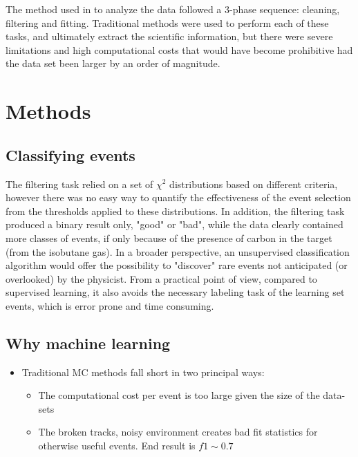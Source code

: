 \documentclass[preprint,12pt]{elsarticle}
\begin{document}
The method used in \cite{Bradt2018} to analyze the data followed a 3-phase sequence: cleaning, filtering and fitting. Traditional methods were used to perform each of these tasks, and ultimately extract the scientific information, but there were severe limitations and high computational costs that would have become prohibitive had the data set been larger by an order of magnitude.

\section{Methods}\label{sec:methods}

\subsection{Classifying  events} 
The filtering task relied on a set of $\chi^2$ distributions based on different criteria, however there was no easy way to quantify the effectiveness of the event selection from the thresholds applied to these distributions. In addition, the filtering task produced a binary result only, "good" or "bad", while the data clearly contained more classes of events, if only because of the presence of carbon in the target (from the isobutane gas). In a broader perspective, an unsupervised classification algorithm would offer the possibility to "discover" rare events not anticipated (or overlooked) by the physicist. From a practical point of view, compared to supervised learning, it also avoids the necessary labeling task of the learning set events, which is error prone and time consuming.

\subsection{Why machine learning}

\begin{itemize}
    \item Traditional MC methods fall short in two principal ways:
    \begin{itemize}
        \item The computational cost per event is too large given the size of the data-sets
        \item The broken tracks, noisy environment creates bad fit statistics for otherwise useful events. End result is $f1 \sim 0.7 $
    \end{itemize}
\end{itemize}
\end{document}
